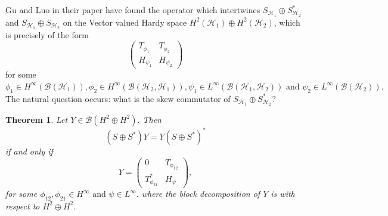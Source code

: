 \documentclass[12pt, reqno]{amsart}
\newtheorem{theorem}{Theorem}[section]
\theoremstyle{definition}
\theoremstyle{remark}
\numberwithin{equation}{section}
\begin{document}
       Gu and Luo in their paper \cite{CGSL} have found the operator which intertwines $S_{\mathcal{H}_1}\oplus S_{\mathcal{H}_2}^*$ and $S_{\mathcal{H}_1}\oplus S_{\mathcal{H}_2}$ on the Vector valued Hardy space $H^2(\mathcal{H}_1)\oplus H^2(\mathcal{H}_2)$, which is precisely of the form
       \begin{equation*}
           \begin{pmatrix}
               T_{\phi_1}& T_{\phi_2}\\
               H_{\psi_1}& H_{\psi_2}
            \end{pmatrix}
       \end{equation*}
       for some 
       $\phi_{1} \in H^\infty(\mathcal{B}(\mathcal{H}_1)), \phi_{2} \in H^\infty(\mathcal{B}(\mathcal{H}_2,\mathcal{H}_1)),\psi_{1} \in  L^\infty (\mathcal{B}(\mathcal{H}_1,\mathcal{H}_2)) \text{ and } \psi_{2} \in L^\infty(\mathcal{B}(\mathcal{H}_2)).$ The natural question occurs: what is the skew commutator of $S_{\mathcal{H}_1}\oplus S_{\mathcal{H}_2}^*$?
       \begin{theorem}\label{skew of S+S*}
           Let $Y\in \mathcal{B}(H^2\oplus H^2).$ Then
           \begin{equation}\label{*}
               (S\oplus S^*)Y=Y(S\oplus S^*)^*
           \end{equation}
           if and only if 
           \begin{equation*}    
                Y=
                \begin{pmatrix}
                0&T_{\phi_{12}}\\
                T^*_{\phi_{21}}&H_\psi
                \end{pmatrix},
            \end{equation*}
             for some $\phi_{12}, \phi_{21} \in H^\infty \text{ and } \psi \in L^\infty.$
            where the block decomposition of $Y$ is with respect to $H^2\oplus H^2.$
            \end{theorem}
\end{document}
